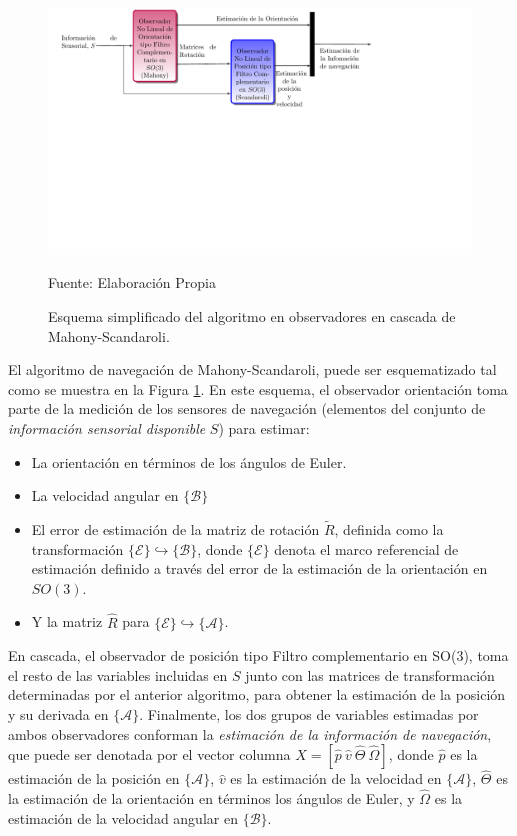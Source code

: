\documentclass[10pt]{report}
\numberwithin{equation}{chapter}
\numberwithin{algorithm}{chapter}
\newcommand{\marco}[1]{\{\mathcal{#1}\}}
\begin{document}
\begin{figure}[t]
\begin{center}
\includegraphics[scale=0.71,viewport=10 220 560 380,clip]{aam2.pdf}
\caption{Esquema simplificado del algoritmo en observadores en cascada de Mahony-Scandaroli.}
\scriptsize{Fuente: Elaboración Propia}
\label{solucionMS_fig1}
\end{center}
\end{figure}
El algoritmo de navegación de Mahony-Scandaroli, puede ser esquematizado tal como se muestra en la Figura \ref{solucionMS_fig1}. En este esquema, el observador orientación toma parte de la medición de los sensores de navegación (elementos del conjunto de \emph{información sensorial disponible} $S$) para estimar:
\begin{itemize}
\item La orientación en términos de los ángulos de Euler.
\item La velocidad angular en $\marco{B}$
\item El error de estimación de la matriz de rotación $\tilde{R}$, definida como la transformación $\marco{E}\hookrightarrow\marco{B}$, donde $\marco{E}$ denota el marco referencial de estimación definido a través del error de la estimación de la orientación en $SO(3)$.
\item Y la matriz $\hat{R}$ para $\marco{E}\hookrightarrow\marco{A}$.
\end{itemize}
En cascada, el observador de posición tipo Filtro complementario en SO(3), toma el resto de las variables incluidas en $S$ junto con las matrices de transformación determinadas por el anterior algoritmo, para obtener la estimación de la posición y su derivada en $\marco{A}$. Finalmente, los dos grupos de variables estimadas por ambos observadores conforman la \emph{estimación de la información de navegación}, que puede ser denotada por el vector columna $X=[\hat{p}~\hat{v}~\hat{\Theta}~\hat{\Omega}]$, donde $\hat{p}$ es la estimación de la posición en $\marco{A}$, $\hat{v}$ es la estimación de la velocidad en $\marco{A}$, $\hat{\Theta}$ es la estimación de la orientación en términos los ángulos de Euler, y $\hat{\Omega}$ es la estimación de la velocidad angular en $\marco{B}$.
\end{document}
